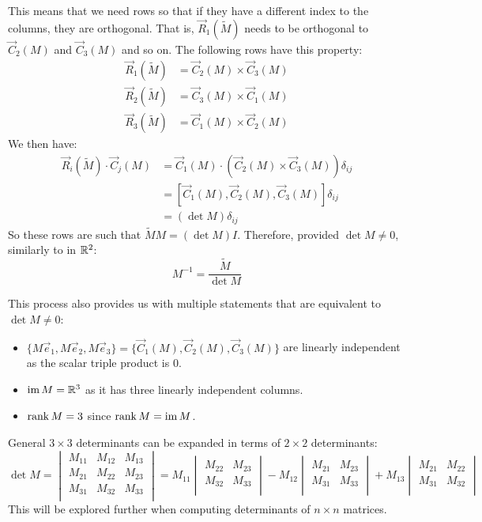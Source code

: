 \documentclass[../main.tex]{subfiles}
\begin{document}
This means that we need rows so that if they have a different index to the columns, they are orthogonal.
That is, $\vec{R}_1(\widetilde{M})$ needs to be orthogonal to $\vec{C}_2(M)$ and $\vec{C}_3(M)$ and so on.
The following rows have this property:
\begin{align*}
  \vec{R}_1(\widetilde{M}) &= \vec{C}_2(M) \times \vec{C}_3 (M) \\
  \vec{R}_2(\widetilde{M}) &= \vec{C}_3(M) \times \vec{C}_1 (M) \\
  \vec{R}_3(\widetilde{M}) &= \vec{C}_1(M) \times \vec{C}_2 (M)
\end{align*}
We then have:
\begin{align*}
  \vec{R}_i(\widetilde{M}) \cdot \vec{C}_j(M) &= \vec{C}_1(M) \cdot (\vec{C}_2(M) \times \vec{C}_3(M))\delta_{i j} \\
                                              &= [\vec{C}_1(M), \vec{C}_2(M), \vec{C}_3(M)]\delta_{i j} \\
                                              &= (\det M)\delta_{i j}
\end{align*}
So these rows are such that $\widetilde{M}M = (\det M)I$.
Therefore, provided $\det M \neq 0$, similarly to in $\mathbb{R}^2$:
\[
  M^{-1} = \frac{\widetilde{M}}{\det M}
\]

This process also provides us with multiple statements that are equivalent to $\det M \neq 0$:
\begin{itemize}
 \item $\{M\vec{e}_1, M\vec{e}_2, M\vec{e}_3\} = \{\vec{C}_1(M), \vec{C}_2(M), \vec{C}_3(M)\}$ are linearly independent as the scalar triple product is $0$.
 \item $\operatorname{im} M = \mathbb{R}^3$ as it has three linearly independent columns.
 \item $\operatorname{rank} M = 3$ since $\operatorname{rank} M = \operatorname{im} M$.
\end{itemize}
\begin{remark}
  General $3 \times 3$ determinants can be expanded in terms of $2 \times 2$ determinants:
  \[
    \det M = \begin{vmatrix}
    M_{1 1} & M_{1 2} & M_{1 3} \\
    M_{2 1} & M_{2 2} & M_{2 3} \\
    M_{3 1} & M_{3 2} & M_{3 3} \\
    \end{vmatrix} =
    M_{1 1} \begin{vmatrix}
    M_{2 2} & M_{2 3} \\
    M_{3 2} & M_{3 3} \\
    \end{vmatrix}
    - M_{1 2}\begin{vmatrix}
    M_{2 1} & M_{2 3} \\
    M_{3 1} & M_{3 3} \\
    \end{vmatrix}
    + M_{1 3}\begin{vmatrix}
    M_{2 1} & M_{2 2} \\
    M_{3 1} & M_{3 2} \\
    \end{vmatrix}
  \]
  This will be explored further when computing determinants of $n \times n$ matrices.
\end{remark}
\end{document}
